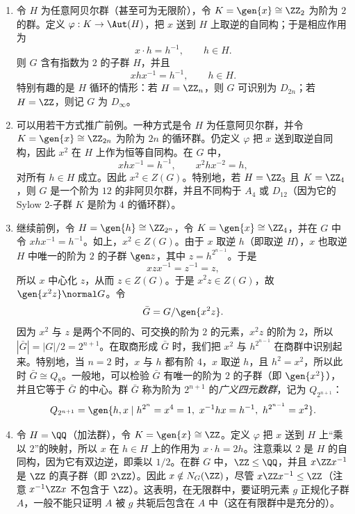 \begin{enumerate}[label=(\arabic*)]
  \item 令 $H$ 为任意阿贝尔群（甚至可为无限阶），令 $K=\gen{x}\cong\ZZ_2$ 为阶为 $2$ 的群。定义 $\varphi:K\to\Aut(H)$，把 $x$ 送到 $H$ 上取逆的自同构；于是相应作用为
  \[
    x\cdot h=h^{-1},\qquad h\in H.
  \]
  则 $G$ 含有指数为 $2$ 的子群 $H$，并且
  \[
    xhx^{-1}=h^{-1},\qquad h\in H.
  \]
  特别有趣的是 $H$ 循环的情形：若 $H=\ZZ_n$，则 $G$ 可识别为 $D_{2n}$；若 $H=\ZZ$，则记 $G$ 为 $D_\infty$。

  \item 可以用若干方式推广前例。一种方式是令 $H$ 为任意阿贝尔群，并令 $K=\gen{x}\cong\ZZ_{2n}$ 为阶为 $2n$ 的循环群。仍定义 $\varphi$ 把 $x$ 送到取逆自同构，因此 $x^2$ 在 $H$ 上作为恒等自同构。在 $G$ 中，
  \[
    xhx^{-1}=h^{-1},\qquad x^2hx^{-2}=h,
  \]
  对所有 $h\in H$ 成立。因此 $x^2\in Z(G)$。特别地，若 $H=\ZZ_3$ 且 $K=\ZZ_4$，则 $G$ 是一个阶为 $12$ 的非阿贝尔群，并且不同构于 $A_4$ 或 $D_{12}$（因为它的 Sylow $2$-子群 $K$ 是阶为 $4$ 的循环群）。

  \item 继续前例，令 $H=\gen{h}\cong\ZZ_{2^n}$，令 $K=\gen{x}\cong\ZZ_4$，并在 $G$ 中令 $xhx^{-1}=h^{-1}$。如上，$x^2\in Z(G)$。由于 $x$ 取逆 $h$（即取逆 $H$），$x$ 也取逆 $H$ 中唯一的阶为 $2$ 的子群 $\gen z$，其中 $z=h^{2^{n-1}}$。于是
  \[
    xzx^{-1}=z^{-1}=z,
  \]
  所以 $x$ 中心化 $z$，从而 $z\in Z(G)$。于是 $x^2z\in Z(G)$，故 $\gen{x^2z}\normal G$。令
  \[
    \bar G=G/\gen{x^2z}.
  \]
  因为 $x^2$ 与 $z$ 是两个不同的、可交换的阶为 $2$ 的元素，$x^2z$ 的阶为 $2$，所以 $|\bar G|=|G|/2=2^{n+1}$。在取商形成 $\bar G$ 时，我们把 $x^2$ 与 $h^{2^{n-1}}$ 在商群中识别起来。特别地，当 $n=2$ 时，$x$ 与 $h$ 都有阶 $4$，$x$ 取逆 $h$，且 $h^2=x^2$，所以此时 $\bar G\cong Q_8$。一般地，可以检验 $\bar G$ 有唯一的阶为 $2$ 的子群（即 $\gen{x^2}$），并且它等于 $\bar G$ 的中心。群 $\bar G$ 称为阶为 $2^{n+1}$ 的\emph{广义四元数群}，记为 $Q_{2^{n+1}}$：
  \[
    Q_{2^{n+1}}=
    \gen{h,x\mid h^{2^n}=x^4=1,
    \ x^{-1}hx=h^{-1},
    \ h^{2^{n-1}}=x^2}.
  \]

  \item 令 $H=\QQ$（加法群），令 $K=\gen{x}\cong\ZZ$。定义 $\varphi$ 把 $x$ 送到 $H$ 上“乘以 $2$”的映射，所以 $x$ 在 $h\in H$ 上的作用为 $x\cdot h=2h$。注意乘以 $2$ 是 $H$ 的自同构，因为它有双边逆，即乘以 $1/2$。在群 $G$ 中，$\ZZ\leq\QQ$，并且 $x\ZZ x^{-1}$ 是 $\ZZ$ 的真子群（即 $2\ZZ$）。因此 $x\notin N_G(\ZZ)$，尽管 $x\ZZ x^{-1}\leq\ZZ$（注意 $x^{-1}\ZZ x$ 不包含于 $\ZZ$）。这表明，在无限群中，要证明元素 $g$ 正规化子群 $A$，一般不能只证明 $A$ 被 $g$ 共轭后包含在 $A$ 中（这在有限群中是充分的）。


\end{enumerate}
